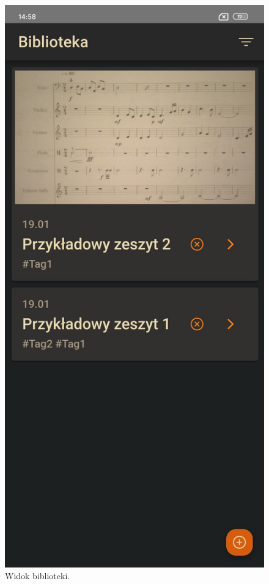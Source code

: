 \begin{figure}[H]
\begin{center}
		\includegraphics[scale=0.2]{media/LibraryView.jpg}
	\end{center}
	\caption{Widok biblioteki.}
	\label{rys:library-view}
\end{figure}

